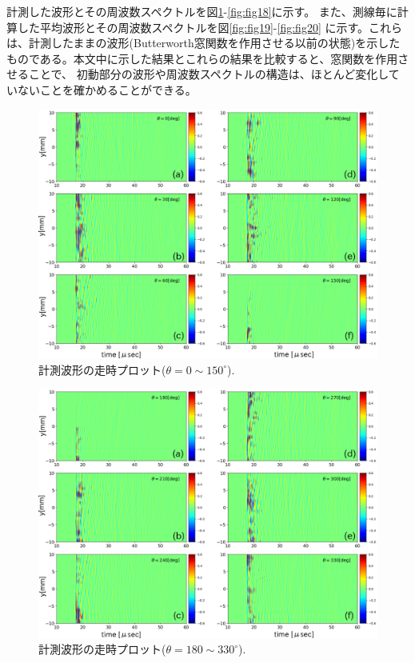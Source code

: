 計測した波形とその周波数スペクトルを図\ref{fig:fig15}-\ref{fig:fig18}に示す。
また、測線毎に計算した平均波形とその周波数スペクトルを図\ref{fig:fig19}-\ref{fig:fig20}
に示す。これらは、計測したままの波形(Butterworth窓関数を作用させる以前の状態)を示した
ものである。本文中に示した結果とこれらの結果を比較すると、窓関数を作用させることで、
初動部分の波形や周波数スペクトルの構造は、ほとんど変化していないことを確かめることができる。
\begin{figure}[h]
	\begin{center}
	\includegraphics[width=1.0\linewidth]{Figs/fig15.eps} 
	\end{center}
	\caption{
		計測波形の走時プロット($\theta=0\sim 150^{\circ}$).
	} 
	\label{fig:fig15}
\end{figure}
\begin{figure}[h]
	\begin{center}
	\includegraphics[width=1.0\linewidth]{Figs/fig16.eps} 
	\end{center}
	\caption{
		計測波形の走時プロット($\theta=180\sim 330^{\circ}$).
	} 
	\label{fig:fig16}
\end{figure}
